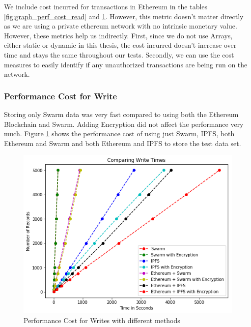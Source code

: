 \documentclass[11pt,openright]{report}
\begin{document}
We include cost incurred for transactions in Ethereum in the tables \ref{fig:graph_perf_cost_read} and \ref{fig:graph_perf_cost_write}. However, this metric doesn't matter directly as we are using a private ethereum network with no intrinsic monetary value. However, these metrics help us indirectly. First, since we do not use Arrays, either static or dynamic in this thesis, the cost incurred doesn't increase over time and stays the same throughout our tests. Secondly, we can use the cost measures to easily identify if any unauthorized transactions are being run on the network.

\subsubsection{Performance Cost for Write}
Storing only Swarm data was very fast compared to using both the Ethereum Blockchain and Swarm. Adding Encryption did not affect the performance very much. Figure \ref{fig:graph_perf_cost_write} shows the performance cost of using just Swarm, IPFS, both Ethereum and Swarm and both Ethereum and IPFS to store the test data set.

\begin{figure}
    \centering
    \includegraphics[scale=0.8]{results/graphs/WriteComp.png}
    \caption{Performance Cost for Writes with different methods}
    \label{fig:graph_perf_cost_write}
\end{figure}
\end{document}
